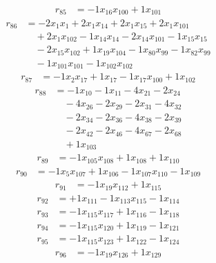 \[\begin{aligned}
r_{85} &= - 1 x_{16} x_{100} + 1 x_{101}
\end{aligned}\]
\[\begin{aligned}
r_{86} &= - 2 x_{1} x_{1} + 2 x_{1} x_{14} + 2 x_{1} x_{15} + 2 x_{1} x_{101} \\
 &\quad + 2 x_{1} x_{102} - 1 x_{14} x_{14} - 2 x_{14} x_{101} - 1 x_{15} x_{15} \\
 &\quad - 2 x_{15} x_{102} + 1 x_{19} x_{104} - 1 x_{80} x_{99} - 1 x_{82} x_{99} \\
 &\quad - 1 x_{101} x_{101} - 1 x_{102} x_{102}
\end{aligned}\]
\[\begin{aligned}
r_{87} &= - 1 x_{2} x_{17} + 1 x_{17} - 1 x_{17} x_{100} + 1 x_{102}
\end{aligned}\]
\[\begin{aligned}
r_{88} &= - 1 x_{10} - 1 x_{11} - 4 x_{21} - 2 x_{24} \\
 &\quad - 4 x_{26} - 2 x_{29} - 2 x_{31} - 4 x_{32} \\
 &\quad - 2 x_{34} - 2 x_{36} - 4 x_{38} - 2 x_{39} \\
 &\quad - 2 x_{42} - 2 x_{46} - 4 x_{67} - 2 x_{68} \\
 &\quad + 1 x_{103}
\end{aligned}\]
\[\begin{aligned}
r_{89} &= - 1 x_{105} x_{108} + 1 x_{108} + 1 x_{110}
\end{aligned}\]
\[\begin{aligned}
r_{90} &= - 1 x_{5} x_{107} + 1 x_{106} - 1 x_{107} x_{110} - 1 x_{109}
\end{aligned}\]
\[\begin{aligned}
r_{91} &= - 1 x_{19} x_{112} + 1 x_{115}
\end{aligned}\]
\[\begin{aligned}
r_{92} &= + 1 x_{111} - 1 x_{113} x_{115} - 1 x_{114}
\end{aligned}\]
\[\begin{aligned}
r_{93} &= - 1 x_{115} x_{117} + 1 x_{116} - 1 x_{118}
\end{aligned}\]
\[\begin{aligned}
r_{94} &= - 1 x_{115} x_{120} + 1 x_{119} - 1 x_{121}
\end{aligned}\]
\[\begin{aligned}
r_{95} &= - 1 x_{115} x_{123} + 1 x_{122} - 1 x_{124}
\end{aligned}\]
\[\begin{aligned}
r_{96} &= - 1 x_{19} x_{126} + 1 x_{129}
\end{aligned}\]
